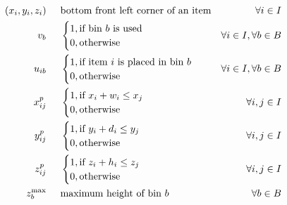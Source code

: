 \begin{align}
              (x_i,y_i,z_i) \hspace{.5cm}& \text{bottom front left corner of an item} & \forall i \in I \label{var:item_pos} \\
                    v_{b} \hspace{.5cm}& \begin{cases}
                                            1, \text{if bin $b$ is used} \\ 
                                            0, \text{otherwise}
                                        \end{cases} & \forall i \in I, \forall b \in B \notag \\
                    u_{ib} \hspace{.5cm}& \begin{cases}
                                            1, \text{if item $i$ is placed in bin $b$} \\ 
                                            0, \text{otherwise}
                                        \end{cases} & \forall i \in I, \forall b \in B \notag \\
                    x^p_{ij} \hspace{.5cm}& \begin{cases}
                                            1, \text{if $x_i + w_i \le x_j$} \\ 
                                            0, \text{otherwise}
                                        \end{cases} & \forall i,j \in I \notag \\
                    y^p_{ij} \hspace{.5cm}& \begin{cases}
                                            1, \text{if $y_i + d_i \le y_j$} \\ 
                                            0, \text{otherwise}
                                        \end{cases} & \forall i,j \in I \notag \\
                    z^p_{ij} \hspace{.5cm}& \begin{cases}
                                            1, \text{if $z_i + h_i \le z_j$} \\ 
                                            0, \text{otherwise}
                                        \end{cases} & \forall i,j \in I \notag \\
            z_b^\text{max} \hspace{.5cm}& \text{maximum height of bin $b$} & \forall b \in B \notag
\end{align}

